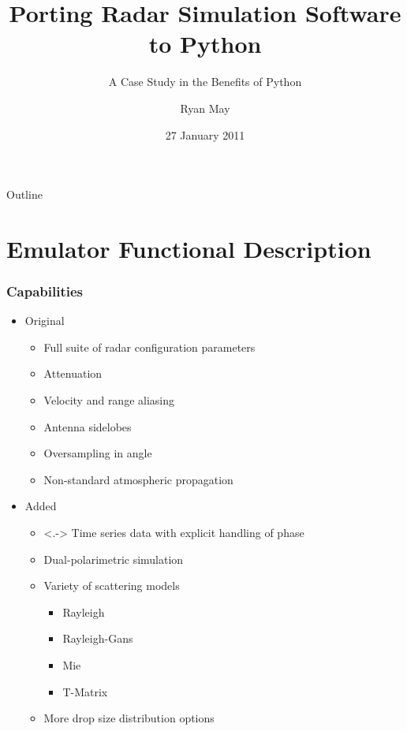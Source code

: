 \documentclass[red, hyperref={pdfpagelabels=false}]{beamer}
\title[Porting Radar Simulation Software]{Porting Radar Simulation Software to Python}
\subtitle{A Case Study in the Benefits of Python}
\author{Ryan May}
\institute[EEC]{Enterprise Electronics Corporation}
\date{27 January 2011}
\begin{document}
\frame{\titlepage}

\section[Outline]{}
\begin{frame}{Outline}
    \tableofcontents
\end{frame}

\section{Emulator Functional Description}
\subsubsection{Capabilities}

\begin{frame}[<+-| alert@+>]{}
    \begin{itemize}
        \item Original
        \begin{itemize}[<.->]
            \item Full suite of radar configuration parameters
            \item Attenuation
            \item Velocity and range aliasing
            \item Antenna sidelobes
            \item Oversampling in angle
            \item Non-standard atmospheric propagation
        \end{itemize}
        \item Added
        \begin{itemize}
            \item <.-> Time series data with explicit handling of phase
            \item Dual-polarimetric simulation
            \item Variety of scattering models
            \begin{itemize}[<.->]
                \item Rayleigh
                \item Rayleigh-Gans
                \item Mie
                \item T-Matrix
            \end{itemize}
            \item More drop size distribution options
        \end{itemize}
    \end{itemize}
\end{frame}
\end{document}
